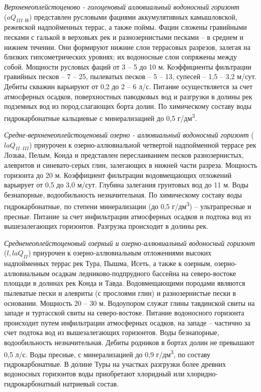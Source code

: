 \documentclass[a4paper,12pt]{article} %
\begin{document}
\textit{ Верхненеоплейстоценово - голоценовый аллювиальный водоносный горизонт } \\($aQ_{III–Н}$) представлен русловыми фациями аккумулятивных камышловской, режевской надпойменных террас, а также поймы. Фации сложены гравийными песками с галькой в верховьях рек и разнозернистыми песками – в среднем и нижнем течении. Они формируют нижние слои террасовых разрезов, залегая на близких гипсометрических уровнях; их водоносные слои сопряжены между собой. Мощности русловых фаций от 3 – 5 до 10 м. Коэффициенты фильтрации гравийных песков – 7 – 25, пылеватых песков – 5 – 13, супесей – 1,5 – 3,2 м/сут. Дебиты скважин варьируют от 0,2 до 2 – 6 л/с. Питание осуществляется за счет атмосферных осадков, поверхностных паводковых вод и разгрузки в долины рек подземных вод из пород,слагающих борта долин. По химическому составу воды гидрокарбонатные кальциевые с минерализацией до 0,5 г/дм\textsuperscript{3}.

\textit{Средне-верхненеоплейстоценовый озерно - аллювиальный водоносный горизонт} ($laQ_{II–III}$) приурочен к озерно-аллювиальной четвертой надпойменной террасе рек Лозьва, Пелым, Конда и представлен переслаиванием песков разнозернистых, алевритов и синевато-серых глин, залегающих в нижней части разреза. Мощность горизонта до 20 м. Коэффициент фильтрации водовмещающих отложений варьирует от 0,5 до 3,0 м/сут. Глубина залегания  грунтовых вод до 11 м. Воды безнапорные, водообильность незначительная. 
По химическому составу воды гидрокарбонатные, по степени минерализации (до 0,5 г/дм\textsuperscript{3}) – ультрапресные и пресные. Питание за счет инфильтрации атмосферных осадков и подтока вод из вышезалегающих горизонтов. Разгрузка происходит в долины рек.

\textit{Средненеоплейстоценовый озерный и озерно-аллювиальный водоносный горизонт} ($l, laQ_{II}$) приурочен к озерно-аллювиальным отложениями высоких надпойменных террас рек Тура, Пышма, Исеть, а также к озерным, 
озерно-аллювиальным осадкам ледниково-подпрудного бассейна на северо-востоке площади в долинах рек Конда и Тавда. Водовмещающими породами являются пылеватые пески и алевриты (с прослоями глин) и разнозернистые пески в основании. Мощность 20 – 30 м. Водоупором служат глины тавдинской свиты на западе и туртасской свиты на северо-востоке. Питание водоносного горизонта происходит путем инфильтрации атмосферных осадков, на западе – частично за счет подтока вод из вышезалегающих горизонтов. Воды безнапорные, водообильность незначительная. Дебиты родников в бортах долин не превышают 0,5 л/с. Воды пресные, с минерализацией до 0,9 г/дм\textsuperscript{3}, по составу гидрокарбонатные. В долине Туры на участках разгрузки более древних водоносных горизонтов воды приобретают хлоридный или хлоридно-гидрокарбонатный натриевый состав.
\end{document}
